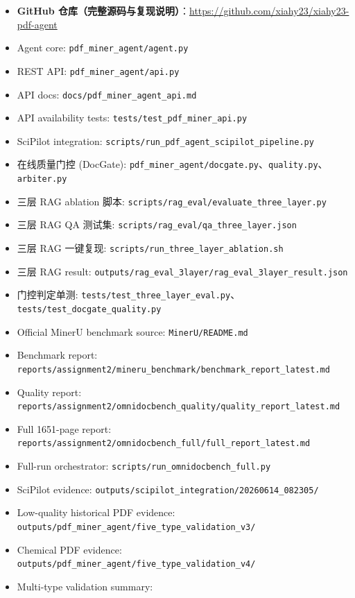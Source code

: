 \documentclass[UTF8,a4paper,11pt]{ctexart}
\begin{document}
\begin{itemize}
  \item \textbf{GitHub 仓库（完整源码与复现说明）}：\url{https://github.com/xiahy23/xiahy23-pdf-agent}
  \item Agent core: \texttt{pdf\_miner\_agent/agent.py}
  \item REST API: \texttt{pdf\_miner\_agent/api.py}
  \item API docs: \texttt{docs/pdf\_miner\_agent\_api.md}
  \item API availability tests: \texttt{tests/test\_pdf\_miner\_api.py}
  \item SciPilot integration: \texttt{scripts/run\_pdf\_agent\_scipilot\_pipeline.py}
  \item 在线质量门控 (DocGate): \texttt{pdf\_miner\_agent/docgate.py}、\texttt{quality.py}、\texttt{arbiter.py}
  \item 三层 RAG ablation 脚本: \texttt{scripts/rag\_eval/evaluate\_three\_layer.py}
  \item 三层 RAG QA 测试集: \texttt{scripts/rag\_eval/qa\_three\_layer.json}
  \item 三层 RAG 一键复现: \texttt{scripts/run\_three\_layer\_ablation.sh}
  \item 三层 RAG result: \texttt{outputs/rag\_eval\_3layer/rag\_eval\_3layer\_result.json}
  \item 门控判定单测: \texttt{tests/test\_three\_layer\_eval.py}、\texttt{tests/test\_docgate\_quality.py}
  \item Official MinerU benchmark source: \texttt{MinerU/README.md}
  \item Benchmark report: \texttt{reports/assignment2/mineru\_benchmark/benchmark\_report\_latest.md}
  \item Quality report: \texttt{reports/assignment2/omnidocbench\_quality/quality\_report\_latest.md}
  \item Full 1651-page report: \texttt{reports/assignment2/omnidocbench\_full/full\_report\_latest.md}
  \item Full-run orchestrator: \texttt{scripts/run\_omnidocbench\_full.py}
  \item SciPilot evidence: \texttt{outputs/scipilot\_integration/20260614\_082305/}
  \item Low-quality historical PDF evidence: \texttt{outputs/pdf\_miner\_agent/five\_type\_validation\_v3/}
  \item Chemical PDF evidence: \texttt{outputs/pdf\_miner\_agent/five\_type\_validation\_v4/}
  \item Multi-type validation summary: 
\end{itemize}
\end{document}
